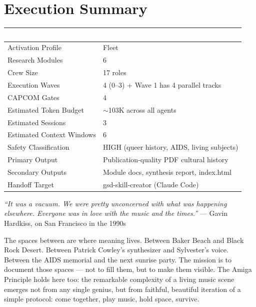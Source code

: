 \documentclass[11pt,letterpaper]{article}
\newcommand{\tableheader}[1]{\textbf{\sffamily\textcolor{white}{#1}}}
\begin{document}
\section{Execution Summary}

\begin{center}
\begin{tabularx}{\textwidth}{L{5cm}X}
\toprule
{}
\tableheader{Metric} & \tableheader{Value} \\
\midrule
Activation Profile & Fleet \\
Research Modules & 6 \\
Crew Size & 17 roles \\
Execution Waves & 4 (0--3) + Wave 1 has 4 parallel tracks \\
CAPCOM Gates & 4 \\
Estimated Token Budget & $\sim$103K across all agents \\
Estimated Sessions & 3 \\
Estimated Context Windows & 6 \\
Safety Classification & HIGH (queer history, AIDS, living subjects) \\
Primary Output & Publication-quality PDF cultural history \\
Secondary Outputs & Module docs, synthesis report, index.html \\
Handoff Target & gsd-skill-creator (Claude Code) \\
\bottomrule
\end{tabularx}
\end{center}

\vspace{2em}

\begin{quotebox}
\textit{``It was a vacuum. We were pretty unconcerned with what was happening elsewhere. Everyone was in love with the music and the times.''} --- Gavin Hardkiss, on San Francisco in the 1990s

\vspace{0.8em}
{\small\sffamily\textcolor{tertiary}{The spaces between are where meaning lives. Between Baker Beach and Black Rock Desert. Between Patrick Cowley's synthesizer and Sylvester's voice. Between the AIDS memorial and the next sunrise party. The mission is to document those spaces --- not to fill them, but to make them visible. The Amiga Principle holds here too: the remarkable complexity of a living music scene emerges not from any single genius, but from faithful, beautiful iteration of a simple protocol: come together, play music, hold space, survive.}}
\end{quotebox}
\end{document}
